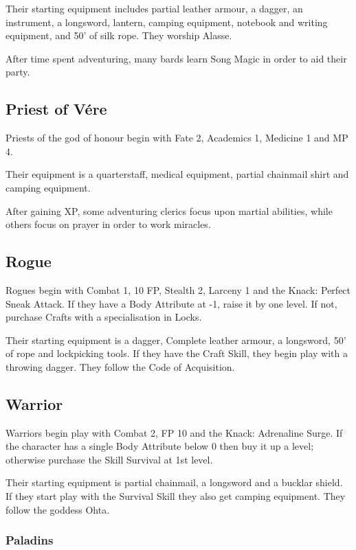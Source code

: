 Their starting equipment includes partial leather armour, a dagger, an instrument, a longsword, lantern, camping equipment, notebook and writing equipment, and 50' of silk rope.  They worship Alasse.

After time spent adventuring, many bards learn Song Magic in order to aid their party.

\subsection{Priest of V\'{e}re}

Priests of the god of honour begin with Fate 2, Academics 1, Medicine 1 and MP 4.

Their equipment is a quarterstaff, medical equipment, partial chainmail shirt and camping equipment.

After gaining XP, some adventuring clerics focus upon martial abilities, while others focus on prayer in order to work miracles.

\subsection{Rogue}

Rogues begin with Combat 1, 10 FP, Stealth 2, Larceny 1 and the Knack: Perfect Sneak Attack.  If they have a Body Attribute at -1, raise it by one level.  If not, purchase Crafts with a specialisation in Locks.

Their starting equipment is a dagger, Complete leather armour, a longsword, 50' of rope and lockpicking tools.  If they have the Craft Skill, they begin play with a throwing dagger.  They follow the Code of Acquisition.

\subsection{Warrior}

Warriors begin play with Combat 2, FP 10 and the Knack: Adrenaline Surge.  If the character has a single Body Attribute below 0 then buy it up a level; otherwise purchase the Skill Survival at 1st level.

Their starting equipment is partial chainmail, a longsword and a bucklar shield.  If they start play with the Survival Skill they also get camping equipment.  They follow the goddess Ohta.

\subsubsection{Paladins}

